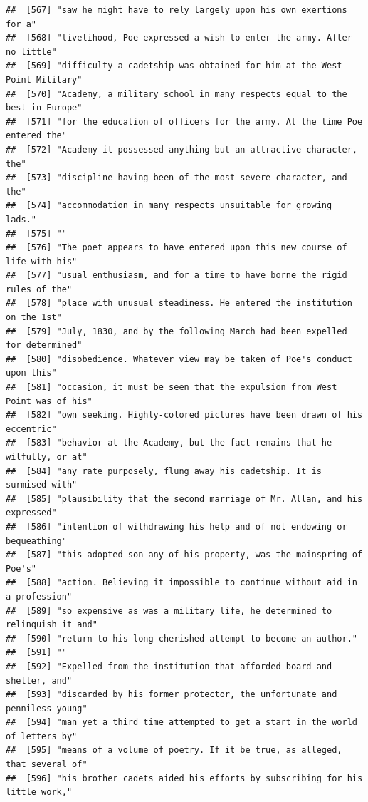 \documentclass{article}\usepackage[]{graphicx}\usepackage[]{color}
\makeatletter
\newenvironment{kframe}{%
 \def\at@end@of@kframe{}%
 \ifinner\ifhmode%
  \def\at@end@of@kframe{\end{minipage}}%
  \begin{minipage}{\columnwidth}%
 \fi\fi%
 \def\FrameCommand##1{\hskip\@totalleftmargin \hskip-\fboxsep
 \colorbox{shadecolor}{##1}\hskip-\fboxsep
     \hskip-\linewidth \hskip-\@totalleftmargin \hskip\columnwidth}%
 \MakeFramed {\advance\hsize-\width
   \@totalleftmargin\z@ \linewidth\hsize
   \@setminipage}}%
 {\par\unskip\endMakeFramed%
 \at@end@of@kframe}
\newenvironment{knitrout}{}{} %
\makeatother
\begin{document}
\begin{knitrout}
\begin{kframe}
\begin{verbatim}
##  [567] "saw he might have to rely largely upon his own exertions for a"              
##  [568] "livelihood, Poe expressed a wish to enter the army. After no little"         
##  [569] "difficulty a cadetship was obtained for him at the West Point Military"      
##  [570] "Academy, a military school in many respects equal to the best in Europe"     
##  [571] "for the education of officers for the army. At the time Poe entered the"     
##  [572] "Academy it possessed anything but an attractive character, the"              
##  [573] "discipline having been of the most severe character, and the"                
##  [574] "accommodation in many respects unsuitable for growing lads."                 
##  [575] ""                                                                            
##  [576] "The poet appears to have entered upon this new course of life with his"      
##  [577] "usual enthusiasm, and for a time to have borne the rigid rules of the"       
##  [578] "place with unusual steadiness. He entered the institution on the 1st"        
##  [579] "July, 1830, and by the following March had been expelled for determined"     
##  [580] "disobedience. Whatever view may be taken of Poe's conduct upon this"         
##  [581] "occasion, it must be seen that the expulsion from West Point was of his"     
##  [582] "own seeking. Highly-colored pictures have been drawn of his eccentric"       
##  [583] "behavior at the Academy, but the fact remains that he wilfully, or at"       
##  [584] "any rate purposely, flung away his cadetship. It is surmised with"           
##  [585] "plausibility that the second marriage of Mr. Allan, and his expressed"       
##  [586] "intention of withdrawing his help and of not endowing or bequeathing"        
##  [587] "this adopted son any of his property, was the mainspring of Poe's"           
##  [588] "action. Believing it impossible to continue without aid in a profession"     
##  [589] "so expensive as was a military life, he determined to relinquish it and"     
##  [590] "return to his long cherished attempt to become an author."                   
##  [591] ""                                                                            
##  [592] "Expelled from the institution that afforded board and shelter, and"          
##  [593] "discarded by his former protector, the unfortunate and penniless young"      
##  [594] "man yet a third time attempted to get a start in the world of letters by"    
##  [595] "means of a volume of poetry. If it be true, as alleged, that several of"     
##  [596] "his brother cadets aided his efforts by subscribing for his little work,"    

\end{verbatim}
\end{kframe}
\end{knitrout}
\end{document}
